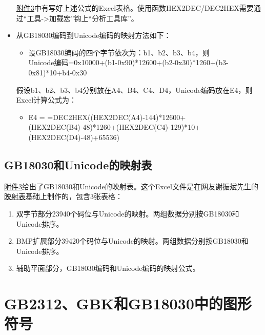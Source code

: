 \documentclass[cn,hazy,blue,14pt,screen]{elegantnote}
\begin{document}
\begin{itemize}
  \href{samples/gb18030.zip}{附件3}中有写好上述公式的Excel表格。使用函数HEX2DEC/DEC2HEX需要通过``工具-\textgreater 加载宏''钩上``分析工具库''。
\item
  从GB18030编码到Unicode编码的映射方法如下：

  \begin{itemize}
  
  \item
    设GB18030编码的四个字节依次为：b1、b2、b3、b4，则\\
    Unicode编码=0x10000+(b1-0x90)*12600+(b2-0x30)*1260+(b3-0x81)*10+b4-0x30
  \end{itemize}

  假设b1、b2、b3、b4分别放在A4、B4、C4、D4，Unicode编码放在E4，则Excel计算公式为：

  \begin{itemize}
  
  \item
    E4 =
    =DEC2HEX((HEX2DEC(A4)-144)*12600+(HEX2DEC(B4)-48)*1260+(HEX2DEC(C4)-129)*10+(HEX2DEC(D4)-48)+65536)
  \end{itemize}
\end{itemize}

\hypertarget{gb18030ux548cunicodeux7684ux6620ux5c04ux8868}{%
\subsection{GB18030和Unicode的映射表}\label{gb18030ux548cunicodeux7684ux6620ux5c04ux8868}}

\href{samples/gb18030.zip}{附件3}给出了GB18030和Unicode的映射表。这个Excel文件是在网友谢振斌先生的\href{http://www.pkucn.com/viewthread.php?tid=188399\&extra=page\%3D1}{映射表}基础上制作的，包含3张表格：

\begin{enumerate}

\item
  双字节部分23940个码位与Unicode的映射。两组数据分别按GB18030和Unicode排序。
\item
  BMP扩展部分39420个码位与Unicode的映射。两组数据分别按GB18030和Unicode排序。
\item
  辅助平面部分，GB18030编码和Unicode编码的映射公式。
\end{enumerate}

\hypertarget{gb2312gbkux548cgb18030ux4e2dux7684ux56feux5f62ux7b26ux53f7}{%
\section{GB2312、GBK和GB18030中的图形符号}\label{gb2312gbkux548cgb18030ux4e2dux7684ux56feux5f62ux7b26ux53f7}}
\end{document}
